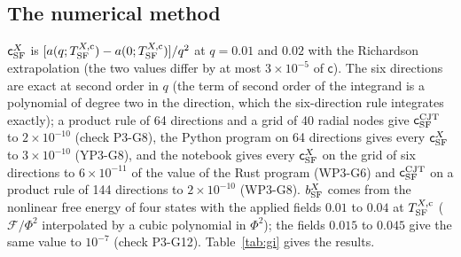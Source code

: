 \documentclass[aps,prd,onecolumn,superscriptaddress,nofootinbib,floatfix,longbibliography]{revtex4-2}
\newcommand{\SF}{{\rm SF}}
\begin{document}
\subsection{The numerical method}

$\mathsf c^X_\SF$ is $[a(q;T^{X,{\rm c}}_\SF)-a(0;T^{X,{\rm c}}_\SF)]/q^2$ at $q=0.01$ and $0.02$ with the Richardson extrapolation (the two values
differ by at most $3\times10^{-5}$ of $\mathsf c$). The six directions are exact at second order in $q$ (the term of second order of the integrand
is a polynomial of degree two in the direction, which the six-direction rule integrates exactly); a product rule of 64 directions
and a grid of 40 radial nodes give $\mathsf c^{\rm CJT}_\SF$ to $2\times10^{-10}$ (check P3-G8), the Python program on 64 directions gives every
$\mathsf c^X_\SF$ to $3\times10^{-10}$ (YP3-G8), and the notebook gives every $\mathsf c^X_\SF$ on the grid of six directions to $6\times10^{-11}$ of the
value of the Rust program (WP3-G6) and $\mathsf c^{\rm CJT}_\SF$ on a product rule of 144 directions to $2\times10^{-10}$ (WP3-G8). $b^X_\SF$ comes from the nonlinear free
energy of four states with the applied fields $0.01$ to $0.04$ at $T^{X,{\rm c}}_\SF$ ($\mathcal F/\Phi^2$ interpolated by a cubic polynomial in
$\Phi^2$); the fields $0.015$ to $0.045$ give the same value to $10^{-7}$ (check P3-G12). Table~\ref{tab:gi} gives the results.
\end{document}
